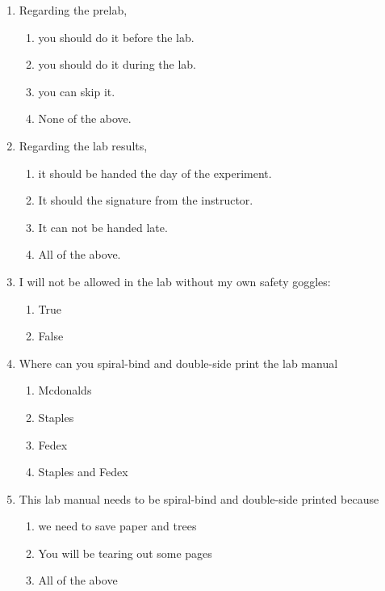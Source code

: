 \documentclass[cover.tex]{subfiles}
\begin{document}
\begin{refsection}
\begin{multicols*}{2}
\begin{enumerate}
\item Regarding the prelab,
\begin{enumerate}[label=(\alph*)]
\item you should do it before the lab.
\item you should do it during the lab.
\item you can skip it.
\item None of the above.
\end{enumerate}

\item Regarding the lab results,
\begin{enumerate}[label=(\alph*)]
\item it should be handed the day of the experiment.
\item It should the signature from the instructor.
\item It can not be handed late.
\item All of the above.
\end{enumerate}

\item I will not be allowed in the lab without my own safety goggles:
\begin{enumerate}[label=(\alph*)]
\item True
\item False
\end{enumerate}

\item Where can you spiral-bind and double-side print  the lab manual
\begin{enumerate}[label=(\alph*)]
\item Mcdonalds
\item Staples
\item Fedex
\item Staples and Fedex
\end{enumerate}

\item This lab manual needs to be spiral-bind and double-side printed because
\begin{enumerate}[label=(\alph*)]
\item we need to save paper and trees
\item You will be tearing out some pages
\item All of the above
\end{enumerate}


\end{enumerate}
\end{multicols*}
\end{refsection}
\end{document}
